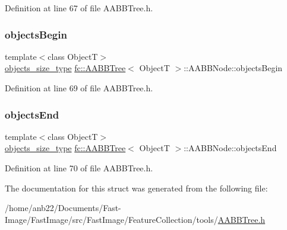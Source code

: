 Definition at line 67 of file A\+A\+B\+B\+Tree.\+h.

\mbox{\label{structfc_1_1AABBTree_1_1AABBNode_a705257db430984c00801167f5a561970}} 
\subsubsection{\texorpdfstring{objects\+Begin}{objectsBegin}}
{\footnotesize\ttfamily template$<$class ObjectT$>$ \\
\hyperlink{classfc_1_1AABBTree_a3333c421c1fa34841043bd8545de8ea8}{objects\+\_\+size\+\_\+type} \hyperlink{classfc_1_1AABBTree}{fc\+::\+A\+A\+B\+B\+Tree}$<$ ObjectT $>$\+::A\+A\+B\+B\+Node\+::objects\+Begin}



Definition at line 69 of file A\+A\+B\+B\+Tree.\+h.

\mbox{\label{structfc_1_1AABBTree_1_1AABBNode_a4033832124c05f502e35f7ffdb5abc56}} 
\subsubsection{\texorpdfstring{objects\+End}{objectsEnd}}
{\footnotesize\ttfamily template$<$class ObjectT$>$ \\
\hyperlink{classfc_1_1AABBTree_a3333c421c1fa34841043bd8545de8ea8}{objects\+\_\+size\+\_\+type} \hyperlink{classfc_1_1AABBTree}{fc\+::\+A\+A\+B\+B\+Tree}$<$ ObjectT $>$\+::A\+A\+B\+B\+Node\+::objects\+End}



Definition at line 70 of file A\+A\+B\+B\+Tree.\+h.



The documentation for this struct was generated from the following file\+:\begin{DoxyCompactItemize}
\item 
/home/anb22/\+Documents/\+Fast-\/\+Image/\+Fast\+Image/src/\+Fast\+Image/\+Feature\+Collection/tools/\hyperlink{AABBTree_8h}{A\+A\+B\+B\+Tree.\+h}\end{DoxyCompactItemize}
